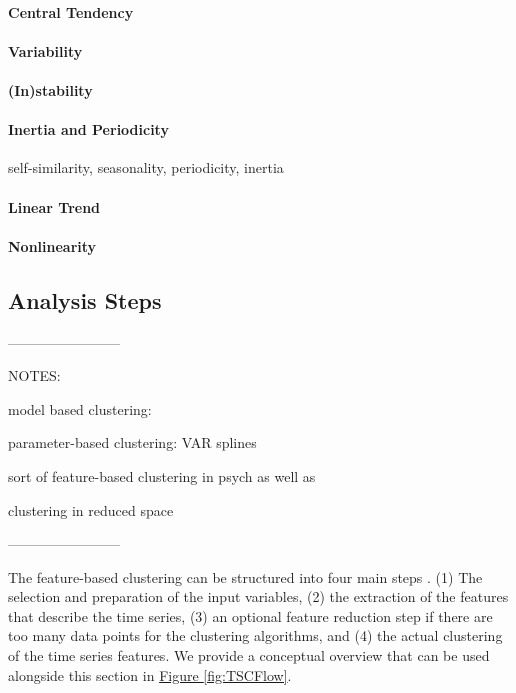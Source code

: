 \documentclass[man, 12pt, a4paper, mask, floatsintext]{apa7}
\theoremstyle{break}
\theoremstyle{plain}
\newcommand{\fgrref}[2][]{\hyperref[#2]{Figure \ref*{#2}#1}}
\begin{document}
\paragraph{Central Tendency}

\paragraph{Variability}

\paragraph{(In)stability}

\paragraph{Inertia and Periodicity} self-similarity, seasonality, periodicity, inertia

\paragraph{Linear Trend}

\paragraph{Nonlinearity}

\subsection{Analysis Steps}

------------------------

NOTES:

model based clustering: \citep{bulteel2016, stefanovic2022}

parameter-based clustering: VAR \citep{ernst2021} splines \citep{axen2011} 

sort of feature-based clustering in psych \citep{heylen2016} as well as \citep{krone2018}

clustering in reduced space \citep{timmerman2013}

------------------------

The feature-based clustering can be structured into four main steps \citep{rasanen2009, wang2006}. (1) The selection and preparation of the input variables, (2) the extraction of the features that describe the time series, (3) an optional feature reduction step if there are too many data points for the clustering algorithms, and (4) the actual clustering of the time series features. We provide a conceptual overview that can be used alongside this section in \fgrref{fig:TSCFlow}. 
\end{document}
